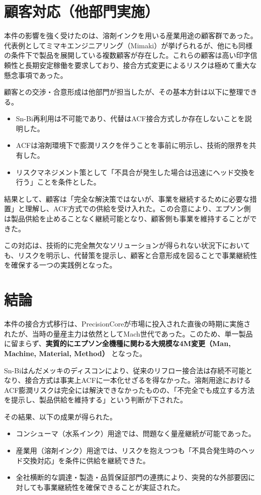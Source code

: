 \documentclass[conference]{IEEEtran}
\begin{document}
\section{顧客対応（他部門実施）}
本件の影響を強く受けたのは、溶剤インクを用いる産業用途の顧客群であった。代表例としてミマキエンジニアリング（Mimaki）が挙げられるが、他にも同様の条件下で製品を展開している複数顧客が存在した。これらの顧客は高い印字信頼性と長期安定稼働を要求しており、接合方式変更によるリスクは極めて重大な懸念事項であった。  

顧客との交渉・合意形成は他部門が担当したが、その基本方針は以下に整理できる。  

\begin{itemize}
 \item Sn-Bi再利用は不可能であり、代替はACF接合方式しか存在しないことを説明した。  
 \item ACFは溶剤環境下で膨潤リスクを伴うことを事前に明示し、技術的限界を共有した。  
 \item リスクマネジメント策として「不具合が発生した場合は迅速にヘッド交換を行う」ことを条件とした。  
\end{itemize}

結果として、顧客は「完全な解決策ではないが、事業を継続するために必要な措置」と理解し、ACF方式での供給を受け入れた。この合意により、エプソン側は製品供給を止めることなく継続可能となり、顧客側も事業を維持することができた。  

この対応は、技術的に完全無欠なソリューションが得られない状況下においても、リスクを明示し、代替策を提示し、顧客と合意形成を図ることで事業継続性を確保する一つの実践例となった。

\section{結論}
本件の接合方式移行は、PrecisionCoreが市場に投入された直後の時期に実施されたが、当時の量産主力は依然としてMach世代であった。このため、単一製品に留まらず、\textbf{実質的にエプソン全機種に関わる大規模な4M変更（Man, Machine, Material, Method）} となった。  

Sn-Biはんだメッキのディスコンにより、従来のリフロー接合法は存続不可能となり、接合方式は事実上ACFに一本化せざるを得なかった。溶剤用途におけるACF膨潤リスクは完全には解決できなかったものの、「不完全でも成立する方法を提示し、製品供給を維持する」という判断が下された。  

その結果、以下の成果が得られた。  
\begin{itemize}
 \item コンシューマ（水系インク）用途では、問題なく量産継続が可能であった。  
 \item 産業用（溶剤インク）用途では、リスクを抱えつつも「不具合発生時のヘッド交換対応」を条件に供給を継続できた。  
 \item 全社横断的な調達・製造・品質保証部門の連携により、突発的な外部要因に対しても事業継続性を確保できることが実証された。  
\end{itemize}
\end{document}
